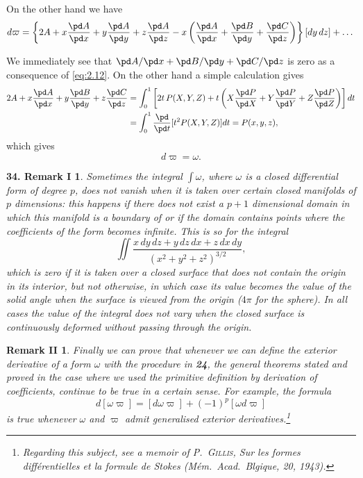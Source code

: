 On the other hand we have
\[
d\varpi=\left\{ 2A+x\frac{\pd A}{\pd x}+y\frac{\pd A}{\pd y}+z\frac{\pd A}{\pd z}-x\left(\frac{\pd A}{\pd x}+\frac{\pd B}{\pd y}+\frac{\pd C}{\pd z}\right) \right\}[dy\,dz]+\dots
\]

We immediately see that $\pd A/\pd x+\pd B/\pd y+\pd C/\pd z$ is zero as a consequence of \eqref{eq:2.12}. On the other hand a simple calculation gives
\begin{align*}
  2A+x\frac{\pd A}{\pd x}+y\frac{\pd B}{\pd y}+z\frac{\pd C}{\pd z}&=\int_{0}^{1}\left[2t\,P(X,Y,Z)+t\left(X\frac{\pd P}{\pd X}+Y\frac{\pd P}{\pd Y}+Z\frac{\pd P}{\pd Z}\right)\right]dt\\
  &=\int_{0}^{1}\frac{\pd}{\pd t}[t^{2}P(X,Y,Z)]dt=P(x,y,z),
\end{align*}
which gives
\[
d\varpi=\omega.
\]

\vspace{12pt}\addtocounter{frenchsec}{1}

\theoremstyle{shape0}
\newtheorem*{rmk34}{\hspace{15pt}\textbf{34.} Remark I}
\newtheorem*{rmkii}{\hspace{15pt}Remark II}
\begin{rmk34}
  Sometimes the integral $\int\omega$, where $\omega$ is a closed differential form of degree $p$, does not vanish when it is taken over certain closed manifolds of $p$ dimensions: this happens if there does not exist a $p+1$ dimensional domain in which this manifold is a boundary of or if the domain contains points where the coefficients of the form becomes infinite. This is so for the integral
\[
\iint\frac{x\,dy\,dz+y\,dz\,dx+z\,dx\,dy}{(x^{2}+y^{2}+z^{2})^{3/2}},
\]
which is zero if it is taken over a closed surface that does not contain the origin in its interior, but not otherwise, in which case its value becomes the value of the solid angle when the surface is viewed from the origin ($4\pi$ for the sphere). In all cases the value of the integral does not vary when the closed surface is continuously deformed without passing through the origin.  
\end{rmk34}
\begin{rmkii}
  Finally we can prove that whenever we can define the exterior derivative of a form $\omega$ with the procedure in \textsection\textbf{24}, the general theorems stated and proved in the case where we used the primitive definition by  derivation of coefficients,  continue to be true in a certain sense. For example, the formula
\[
d[\omega\varpi]=[d\omega\varpi]+(-1)^{p}[\omega d\varpi]
\]
is true whenever $\omega$ and $\varpi$ admit generalised exterior derivatives.\footnote{Regarding this subject, see a memoir of \textsc{P.~Gillis}, \emph{Sur les formes diff\'erentielles et la formule de Stokes} (M\'em.~Acad.~Blgique, 20, 1943).}
\end{rmkii}

